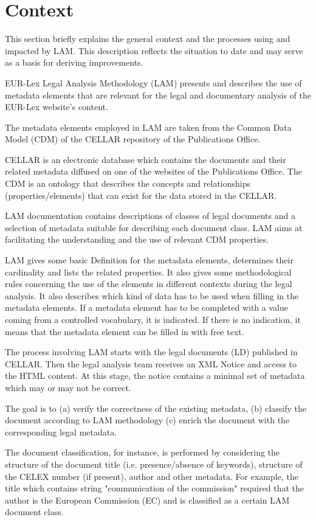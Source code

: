 
\section{Context}\label{ariaid-title12}

This section briefly explains the general context and the processes
using and impacted by LAM. This description reflects the situation to
date and may serve as a basis for deriving improvements.

EUR-Lex Legal Analysis Methodology (LAM) presents and describes the use
of metadata elements that are relevant for the legal and documentary
analysis of the EUR-Lex website's content.

The metadata elements employed in LAM are taken from the Common Data
Model (CDM) of the CELLAR repository of the Publications Office.

CELLAR is an electronic database which contains the documents and their
related metadata diffused on one of the websites of the Publications
Office. The CDM is an ontology that describes the concepts and
relationships (properties/elements) that can exist for the data stored
in the CELLAR.

LAM documentation contains descriptions of classes of legal documents
and a selection of metadata suitable for describing each document class.
LAM aims at facilitating the understanding and the use of relevant CDM
properties.

LAM gives some basic Definition for the metadata elements, determines
their cardinality and lists the related properties. It also gives some
methodological rules concerning the use of the elements in different
contexts during the legal analysis. It also describes which kind of data
has to be used when filling in the metadata elements. If a metadata
element has to be completed with a value coming from a controlled
vocabulary, it is indicated. If there is no indication, it means that
the metadata element can be filled in with free text.

The process involving LAM starts with the legal documents (LD) published
in CELLAR. Then the legal analysis team receives an XML Notice and
access to the HTML content. At this stage, the notice contains a minimal
set of metadata which may or may not be correct.

The goal is to (a) verify the correctness of the existing metadata, (b)
classify the document according to LAM methodology (c) enrich the
document with the corresponding legal metadata.

The document classification, for instance, is performed by considering
the structure of the document title (i.e. presence/absence of keywords),
structure of the CELEX number (if present), author and other metadata.
For example, the title which contains string "communication of the
commission" required that the author is the European Commission (EC) and
is classified as a certain LAM document class.

